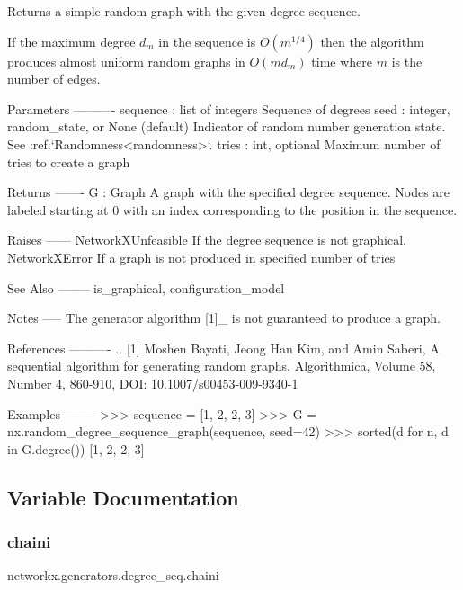 \begin{DoxyVerb}Returns a simple random graph with the given degree sequence.

If the maximum degree $d_m$ in the sequence is $O(m^{1/4})$ then the
algorithm produces almost uniform random graphs in $O(m d_m)$ time
where $m$ is the number of edges.

Parameters
----------
sequence :  list of integers
    Sequence of degrees
seed : integer, random_state, or None (default)
    Indicator of random number generation state.
    See :ref:`Randomness<randomness>`.
tries : int, optional
    Maximum number of tries to create a graph

Returns
-------
G : Graph
    A graph with the specified degree sequence.
    Nodes are labeled starting at 0 with an index
    corresponding to the position in the sequence.

Raises
------
NetworkXUnfeasible
    If the degree sequence is not graphical.
NetworkXError
    If a graph is not produced in specified number of tries

See Also
--------
is_graphical, configuration_model

Notes
-----
The generator algorithm [1]_ is not guaranteed to produce a graph.

References
----------
.. [1] Moshen Bayati, Jeong Han Kim, and Amin Saberi,
   A sequential algorithm for generating random graphs.
   Algorithmica, Volume 58, Number 4, 860-910,
   DOI: 10.1007/s00453-009-9340-1

Examples
--------
>>> sequence = [1, 2, 2, 3]
>>> G = nx.random_degree_sequence_graph(sequence, seed=42)
>>> sorted(d for n, d in G.degree())
[1, 2, 2, 3]
\end{DoxyVerb}
 

\subsection{Variable Documentation}
\mbox{\label{namespacenetworkx_1_1generators_1_1degree__seq_a72aeda943ae7529b7d934d17e6630338}} 
\subsubsection{\texorpdfstring{chaini}{chaini}}
{\footnotesize\ttfamily networkx.\+generators.\+degree\+\_\+seq.\+chaini}

